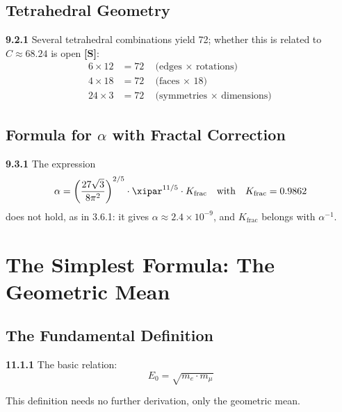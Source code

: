 \subsection{Tetrahedral Geometry}

\begin{tcolorbox}[colback=yellow!5!white,colframe=red!75!black,title=Tetrahedral Numbers]
	\noindent \textbf{9.2.1} Several tetrahedral combinations yield 72; whether this is related to $C \approx 68.24$ is open \textbf{[S]}:
	\begin{align}
		6 \times 12 &= 72 \quad \text{(edges $\times$ rotations)} \\
		4 \times 18 &= 72 \quad \text{(faces $\times$ 18)} \\
		24 \times 3 &= 72 \quad \text{(symmetries $\times$ dimensions)}
	\end{align}
\end{tcolorbox}

\subsection{Formula for $\alpha$ with Fractal Correction}

\noindent \textbf{9.3.1} The expression
\begin{equation}
	\alpha = \left( \frac{27 \sqrt{3}}{8 \pi^2} \right)^{2/5} \cdot \xipar^{11/5} \cdot K_{\text{frac}}
	\quad \text{with} \quad K_{\text{frac}} = 0.9862
\end{equation}
does not hold, as in 3.6.1: it gives $\alpha \approx 2.4\times10^{-9}$, and $K_{\text{frac}}$ belongs with $\alpha^{-1}$.

\section{The Simplest Formula: The Geometric Mean}

\subsection{The Fundamental Definition}

\begin{tcolorbox}[colback=yellow!10!white,colframe=red!75!black,title=\textbf{The Simplest Formula}]
	\noindent \textbf{11.1.1} The basic relation:
	\begin{equation}
		\boxed{E_0 = \sqrt{m_e \cdot m_\mu}}
	\end{equation}
	
	This definition needs no further derivation, only the geometric mean.
\end{tcolorbox}

